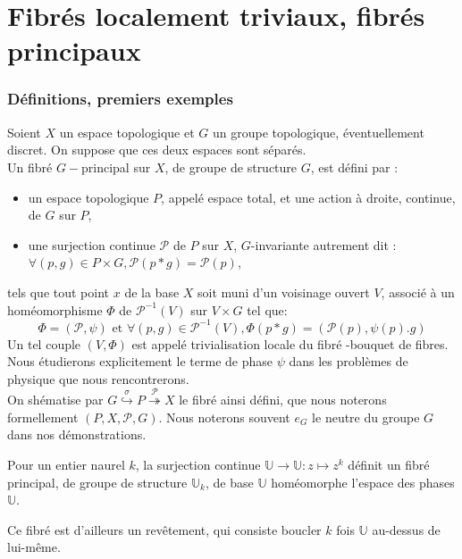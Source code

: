 \chapter{Fibr\'es localement triviaux, fibr\'es principaux}

\subsection{D\'efinitions, premiers exemples}

\begin{defi}
Soient $X$ un espace topologique et $G$ un groupe topologique, éventuellement discret. On suppose que ces deux espaces sont séparés.\\
Un fibré $G-$principal sur $X$, de groupe de structure $G$, est défini par :
\begin{itemize}
\item un espace topologique $P$, appelé espace total, et une action à droite, continue, de $G$ sur $P$,
\item une surjection continue $\mathcal{P}$ de $P$ sur $X$, $G$-invariante autrement dit : $\forall (p,g) \in P \times G , \mathcal{P} (p \ast g) = \mathcal{P} (p)$,
\end{itemize}
tels que tout point $x$ de la base $X$ soit muni d'un voisinage ouvert $V$, associé à un homéomorphisme $\Phi$ de $\mathcal{P}^{-1}(V)$ sur $V \times G$ tel que:
\[
\Phi = (\mathcal{P} , \psi)\text{ et }\forall (p,g) \in \mathcal{P}^{-1} (V) , \Phi(p \ast g) = (\mathcal{P}(p), \psi(p).g)
\]
Un tel couple $(V, \Phi)$ est appelé trivialisation locale du fibré -bouquet de fibres. Nous étudierons explicitement le terme de phase $\psi$ dans les problèmes de physique que nous rencontrerons.\\
On sh\'ematise par $G \overset{\sigma}{\hookrightarrow} P \overset{\mathcal{P}}{\twoheadrightarrow} X$ le fibré ainsi défini, %
que nous noterons formellement $(P,X,\mathcal{P},G)$. Nous noterons souvent $e_G$ le neutre du groupe $G$ dans nos démonstrations.
\end{defi}

\begin{exem}
Pour un entier naurel $k$, la surjection continue $\mathbb{U}\rightarrow\mathbb{U}:z\mapsto z^k$ d\'efinit un fibr\'e principal, %
de groupe de structure $\mathbb{U}_k$, de base $\mathbb{U}$ hom\'eomorphe  l'espace des phases $\mathbb{U}$.
\par
Ce fibr\'e est d'ailleurs un rev\^etement, qui consiste  boucler $k$ fois $\mathbb{U}$ au-dessus de lui-m\^eme.
\end{exem}

